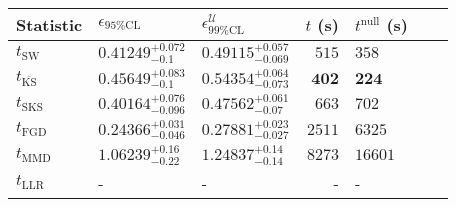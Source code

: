 \begin{tabular}{l|llr|llr}
	Statistic & $\epsilon_{95\%\mathrm{CL}}$ & $\epsilon^    {\mathcal{U}}_{99\%\mathrm{CL}}$ & $t$ (s) & $t^{\mathrm{null}}$ (s) \\
	\midrule
	$t_{\mathrm{SW}}$ & $0.41249_{-0.1}^{+0.072}$ & $0.49115_{-0.069}^{+0.057}$ & $515$ & $358$ \\
	$t_{\overline{\mathrm{KS}}}$ & $0.45649_{-0.1}^{+0.083}$ & $0.54354_{-0.073}^{+0.064}$ & ${\mathbf{402}}$ & ${\mathbf{224}}$ \\
	$t_{\mathrm{SKS}}$ & $0.40164_{-0.096}^{+0.076}$ & $0.47562_{-0.07}^{+0.061}$ & $663$ & $702$ \\
	$t_{\mathrm{FGD}}$ & ${\mathbf{0.24366_{-0.046}^{+0.031}}}$ & ${\mathbf{0.27881_{-0.027}^{+0.023}}}$ & $2511$ & $6325$ \\
	$t_{\mathrm{MMD}}$ & $1.06239_{-0.22}^{+0.16}$ & $1.24837_{-0.14}^{+0.14}$ & $8273$ & $16601$ \\
	$t_{\mathrm{LLR}}$ & - & - & - & - \\
	\bottomrule
\end{tabular}